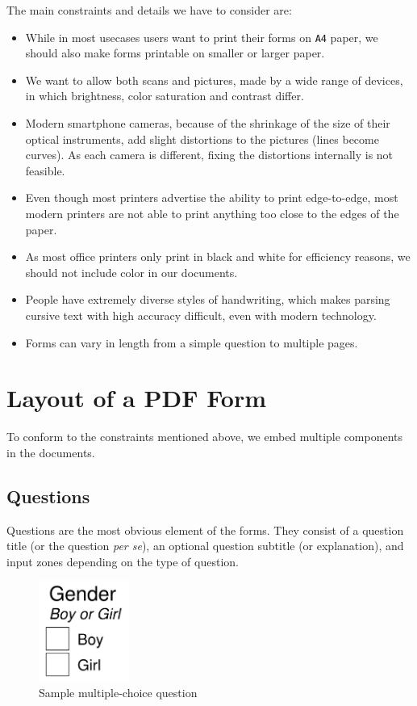 \documentclass[11pt, a4paper]{report}
\def\code#1{\texttt{#1}}
\begin{document}
The main constraints and details we have to consider are:
\begin{itemize}
    \item While in most usecases users want to print their forms on \code{A4} paper, we should also make forms printable on smaller or larger paper.
    \item We want to allow both scans and pictures, made by a wide range of devices, in which brightness, color saturation and contrast differ.
    \item Modern smartphone cameras, because of the shrinkage of the size of their optical instruments, add slight distortions to the pictures (lines become curves). As each camera is different, fixing the distortions internally is not feasible.
    \item Even though most printers advertise the ability to print edge-to-edge, most modern printers are not able to print anything too close to the edges of the paper.
    \item As most office printers only print in black and white for efficiency reasons, we should not include color in our documents.
    \item People have extremely diverse styles of handwriting, which makes parsing cursive text with high accuracy difficult, even with modern technology.
    \item Forms can vary in length from a simple question to multiple pages.
\end{itemize}

\section{Layout of a PDF Form}

To conform to the constraints mentioned above, we embed multiple components in the documents.

\subsection{Questions}

Questions are the most obvious element of the forms. They consist of a question title (or the question \emph{per se}), an optional question subtitle (or explanation), and input zones depending on the type of question.

\begin{figure}[!h]
    \centering
    \includegraphics[width=8em]{images/screenshoots/sample-multiple-choice-question.png}
    \caption{Sample multiple-choice question}
    \label{multiple-choice-question}
\end{figure}
\end{document}
